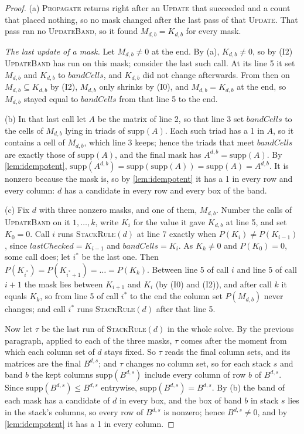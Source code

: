 \documentclass[11pt]{article}
\theoremstyle{definition}
\theoremstyle{plain}
\let\origtextsc\textsc
\renewcommand{\textsc}[1]{\textup{\origtextsc{#1}}}
\begin{document}
\begin{proof}
(a) \textsc{Propagate} returns right after an \textsc{Update} that succeeded and a count that placed nothing, so no
mask changed after the last pass of that \textsc{Update}. That pass ran no \textsc{UpdateBand}, so it found
$M_{d,b}=K_{d,b}$ for every mask.

\emph{The last update of a mask.} Let $M_{d,b}\neq 0$ at the end. By (a), $K_{d,b}\neq 0$, so by (I2)
\textsc{UpdateBand} has run on this mask; consider the last such call. At its line 5 it set $M_{d,b}$ and $K_{d,b}$ to
$\mathit{bandCells}$, and $K_{d,b}$ did not change afterwards. From then on $M_{d,b}\subseteq K_{d,b}$ by (I2), $M_{d,b}$
only shrinks by (I0), and $M_{d,b}=K_{d,b}$ at the end, so $M_{d,b}$ stayed equal to $\mathit{bandCells}$ from that line 5
to the end.

(b) In that last call let $A$ be the matrix of line 2, so that line 3 set $\mathit{bandCells}$ to the cells of
$M_{d,b}$ lying in triads of $\mathrm{supp}(A)$. Each such triad has a 1 in $A$, so it contains a cell of $M_{d,b}$,
which line 3 keeps; hence the triads that meet $\mathit{bandCells}$ are exactly those of $\mathrm{supp}(A)$, and the
final mask has $A^{d,b}=\mathrm{supp}(A)$. By \cref{lem:idempotent},
$\mathrm{supp}(A^{d,b})=\mathrm{supp}(\mathrm{supp}(A))=\mathrm{supp}(A)=A^{d,b}$. It is nonzero because the mask is,
so by \cref{lem:idempotent} it has a 1 in every row and every column: $d$ has a candidate in every row and every box
of the band.

(c) Fix $d$ with three nonzero masks, and one of them, $M_{d,b}$. Number the calls of \textsc{UpdateBand} on it
$1,\dots,k$, write $K_i$ for the value it gave $K_{d,b}$ at line 5, and set $K_0=0$. Call $i$ runs
\textsc{StackRule}$(d)$ at line 7 exactly when $P(K_i)\neq P(K_{i-1})$, since $\mathit{lastChecked}=K_{i-1}$ and
$\mathit{bandCells}=K_i$. As $K_k\neq 0$ and $P(K_0)=0$, some call does; let $i^*$ be the last one. Then
$P(K_{i^*})=P(K_{i^*+1})=\dots=P(K_k)$. Between line 5 of call $i$ and line 5 of call $i+1$ the mask lies between
$K_{i+1}$ and $K_i$ (by (I0) and (I2)), and after call $k$ it equals $K_k$, so from line 5 of call $i^*$ to the end the
column set $P(M_{d,b})$ never changes; and call $i^*$ runs \textsc{StackRule}$(d)$ after that line 5.

Now let $\tau$ be the last run of \textsc{StackRule}$(d)$ in the whole solve. By the previous paragraph, applied to
each of the three masks, $\tau$ comes after the moment from which each column set of $d$ stays fixed. So $\tau$ reads
the final column sets, and its matrices are the final $B^{d,s}$; and $\tau$ changes no column set, so for each stack
$s$ and band $b$ the kept columns $\mathrm{supp}(B^{d,s})$ include every column of row $b$ of $B^{d,s}$. Since
$\mathrm{supp}(B^{d,s})\le B^{d,s}$ entrywise, $\mathrm{supp}(B^{d,s})=B^{d,s}$. By (b) the band of each mask has a
candidate of $d$ in every box, and the box of band $b$ in stack $s$ lies in the stack's columns, so every row of
$B^{d,s}$ is nonzero; hence $B^{d,s}\neq 0$, and by \cref{lem:idempotent} it has a 1 in every column.


\end{proof}
\end{document}

